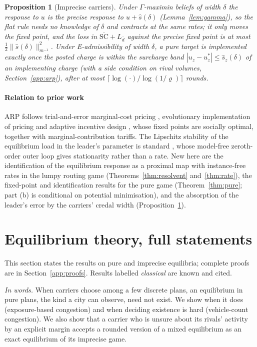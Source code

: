 \documentclass[preprint,11pt]{elsarticle}
\newtheorem{proposition}[theorem]{Proposition}
\theoremstyle{definition}
\theoremstyle{remark}
\begin{document}
\begin{proposition}[Imprecise carriers]\label{prop:arpcredal}
Under $\Gamma$-maximin beliefs of width $\delta$ the response to $u$ is the precise response to $u+\hat s(\delta)$ (Lemma~\ref{lem:gamma}), so the flat rule needs no knowledge of $\delta$ and contracts at the same rates; it only moves the fixed point, and the loss in $\overline{\mathrm{SC}}+L_{\bar d}$ against the precise fixed point is at most $\tfrac12\|\hat s(\delta)\|_{m^{-1}}^2$. Under E-admissibility of width $\delta$, a pure target is implemented exactly once the posted charge is within the surcharge band $|u_z-u^*_z|\le\hat s_z(\delta)$ of an implementing charge (with a side condition on rival volumes, Section~\ref{app:arp}), after at most $\lceil\log(\cdot)/\log(1/\varrho)\rceil$ rounds.
\end{proposition}

\paragraph{Relation to prior work} ARP follows trial-and-error marginal-cost pricing \citep{Yang2004,HanYang2009,YeYangTan2015}, evolutionary implementation of pricing \citep{Sandholm2002} and adaptive incentive design \citep{Maheshwari2022,Maheshwari2026}, whose fixed points are socially optimal, together with marginal-contribution tariffs. The Lipschitz stability of the equilibrium load in the leader's parameter is standard \citep[cf.][Lemma~2.6]{Masiha2026}, whose model-free zeroth-order outer loop gives stationarity rather than a rate. New here are the identification of the equilibrium response as a proximal map with instance-free rates in the lumpy routing game (Theorems~\ref{thm:resolvent} and~\ref{thm:rate}), the fixed-point and identification results for the pure game (Theorem~\ref{thm:pure}; part (b) is conditional on potential minimisation), and the absorption of the leader's error by the carriers' credal width (Proposition~\ref{prop:arpcredal}).

\section{Equilibrium theory, full statements}\label{sec:theory}

This section states the results on pure and imprecise equilibria; complete proofs are in Section~\ref{app:proofs}. Results labelled \emph{classical} are known and cited.

\emph{In words.} When carriers choose among a few discrete plans, an equilibrium in pure plans, the kind a city can observe, need not exist. We show when it does (exposure-based congestion) and when deciding existence is hard (vehicle-count congestion). We also show that a carrier who is unsure about its rivals' activity by an explicit margin accepts a rounded version of a mixed equilibrium as an exact equilibrium of its imprecise game.
\end{document}
